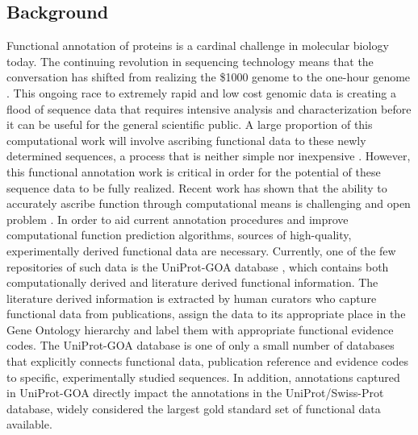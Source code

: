 \documentclass[10pt]{bmc_article}
\newenvironment{bmcformat}{\begin{raggedright}\baselineskip20pt\sloppy\setboolean{publ}{false}}{\end{raggedright}\baselineskip20pt\sloppy}
\begin{document}
\begin{bmcformat}
\section*{Background} Functional annotation of proteins is a cardinal challenge
in molecular biology today. The continuing revolution in sequencing technology
means that the conversation has shifted from realizing the \$1000 genome to the
one-hour genome  \cite{PMID 22443932}. This ongoing race to extremely rapid and
low cost genomic data is creating a flood of sequence data that requires
intensive analysis and characterization before it can be useful for the general
scientific public. A large proportion of this computational work will involve
ascribing functional data to these newly determined sequences, a process that
is neither simple nor inexpensive \cite{gerstein paper PMID 21867570}. However,
this functional annotation work is critical in order for the potential of these
sequence data to be fully realized. Recent work has shown that  the ability to
accurately ascribe function through computational means is challenging and open
problem \cite{schnoes paper? cafa paper?}. In order to aid current annotation
procedures and improve computational function prediction algorithms, sources of
high-quality, experimentally derived functional data are necessary. Currently,
one of the few repositories of such data is the UniProt-GOA database
\cite{U-GOA ref}, which contains both computationally derived and literature
derived functional information. The literature derived information is extracted
by human curators who  capture functional data from publications, assign the
data to its appropriate place in the Gene Ontology hierarchy \cite{GO ref} and
label them with appropriate functional evidence codes. The UniProt-GOA database
is one of only a small number of databases that explicitly connects functional
data, publication reference and evidence codes to specific, experimentally
studied sequences. In addition, annotations captured in UniProt-GOA directly
impact the annotations in the UniProt/Swiss-Prot database, widely considered
the largest gold standard set of functional data \cite{swissprot ref}
available. 


\end{bmcformat}
\end{document}
